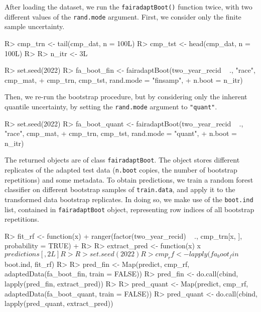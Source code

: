\documentclass[
  nojss]{jss}
\begin{document}
After loading the dataset, we run the \texttt{fairadaptBoot()} function
twice, with two different values of the \texttt{rand.mode} argument.
First, we consider only the finite sample uncertainty.

\begin{CodeChunk}
\begin{CodeInput}
R> cmp_trn <- tail(cmp_dat, n = 100L)
R> cmp_tst <- head(cmp_dat, n = 100L)
R> 
R> n_itr <- 3L
\end{CodeInput}
\end{CodeChunk}

\begin{CodeChunk}
\begin{CodeInput}
R> set.seed(2022)
R> fa_boot_fin <- fairadaptBoot(two_year_recid ~ ., "race", cmp_mat,
+                              cmp_trn, cmp_tst, rand.mode = "finsamp",
+                              n.boot = n_itr)
\end{CodeInput}
\end{CodeChunk}

Then, we re-run the bootstrap procedure, but by considering only the
inherent quantile uncertainty, by setting the \texttt{rand.mode}
argument to \texttt{"quant"}.

\begin{CodeChunk}
\begin{CodeInput}
R> set.seed(2022)
R> fa_boot_quant <- fairadaptBoot(two_year_recid ~ ., "race", cmp_mat,
+                                cmp_trn, cmp_tst, rand.mode = "quant",
+                                n.boot = n_itr)
\end{CodeInput}
\end{CodeChunk}

The returned objects are of class \texttt{fairadaptBoot}. The object
stores different replicates of the adapted test data (\texttt{n.boot}
copies, the number of bootstrap repetitions) and some metadata. To
obtain predictions, we train a random forest classifier on different
bootstrap samples of \texttt{train.data}, and apply it to the
transformed data bootstrap replicates. In doing so, we make use of the
\texttt{boot.ind} list, contained in \texttt{fairadaptBoot} object,
representing row indices of all bootstrap repetitions.

\begin{CodeChunk}
\begin{CodeInput}
R> fit_rf <- function(x) {
+   ranger(factor(two_year_recid) ~ ., cmp_trn[x, ], probability = TRUE)
+ }
R> 
R> extract_pred <- function(x) x$predictions[, 2L]
R> 
R> set.seed(2022)
R> cmp_rf <- lapply(fa_boot_fin$boot.ind, fit_rf)
R> 
R> pred_fin <- Map(predict, cmp_rf, adaptedData(fa_boot_fin, train = FALSE)) 
R> pred_fin <- do.call(cbind, lapply(pred_fin, extract_pred))
R> 
R> pred_quant <- Map(predict, cmp_rf, adaptedData(fa_boot_quant, train = FALSE))
R> pred_quant <- do.call(cbind, lapply(pred_quant, extract_pred))
\end{CodeInput}
\end{CodeChunk}
\end{document}
